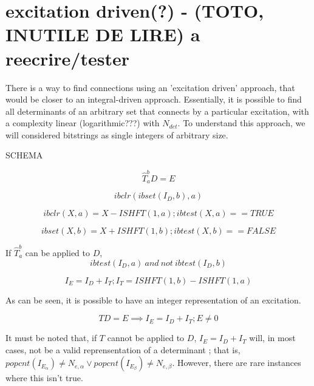 \section{excitation driven(?) - (TOTO, INUTILE DE LIRE) a reecrire/tester}

There is a way to find connections using an 'excitation driven' approach, that would be closer to an integral-driven approach. Essentially, it is possible to find all determinants of an arbitrary set that connects by a particular excitation, with a complexity linear (logarithmic???) with $N_{det}$.
To understand this approach, we will considered bitstrings as single integers of arbitrary size.

SCHEMA


\begin{equation}
\hat T_{a}^{b} D = E
\end{equation}

\begin{equation}
ibclr(ibset(I_D, b), a)
\end{equation}
 
 
\begin{equation}
ibclr(X, a) = X - ISHFT(1,a) ; ibtest(X,a) == TRUE
\end{equation}

\begin{equation}
ibset(X, b) = X + ISHFT(1,b) ; ibtest(X,b) == FALSE
\end{equation}

If $\hat T_{a}^b$ can be applied to $D$, 
\begin{equation}
ibtest(I_D,a)\ and\ not\ ibtest(I_D,b)
\end{equation}

\begin{equation}
I_E = I_D + I_T ; I_T = ISHFT(1,b) - ISHFT(1,a)
\end{equation}

As can be seen, it is possible to have an integer representation of an excitation.

\begin{equation}
TD = E \implies I_E = I_D + I_T ; E \neq 0
\end{equation}

It must be noted that, if $T$ cannot be applied to $D$, $I_E = I_D + I_T$ will, in most cases, not be a valid reprensentation of a determinant ; that is, $popcnt(I_{E_\alpha}) \neq N_{e,\alpha} \vee popcnt(I_{E_\beta}) \neq N_{e,\beta}$. However, there are rare instances where this isn't true.

